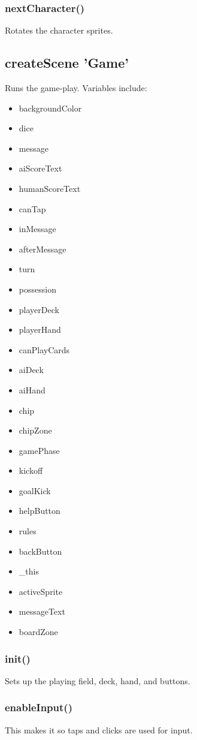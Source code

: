 \documentclass[12pt]{article}
\begin{document}
\subsubsection*{nextCharacter()}
Rotates the character sprites.

\subsection*{createScene 'Game'}
Runs the game-play. 
Variables include: 
\begin{itemize}
\item backgroundColor
\item dice 
\item message
\item aiScoreText 
\item humanScoreText
\item canTap
\item inMessage
\item afterMessage
\item turn 
\item possession
\item playerDeck
\item playerHand
\item canPlayCards
\item aiDeck
\item aiHand
\item chip
\item chipZone 
\item gamePhase 
\item kickoff
\item goalKick
\item helpButton
\item rules 
\item backButton
\item \_this
\item activeSprite
\item messageText
\item boardZone 
\end{itemize}

\subsubsection*{init()}
Sets up the playing field, deck, hand, and buttons. 
\subsubsection*{enableInput()}
This makes it so taps and clicks are used for input. 
\end{document}

